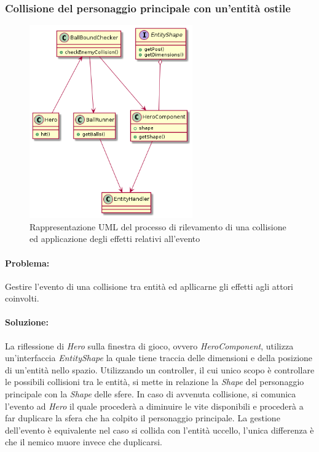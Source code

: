 \documentclass[a4paper,12pt]{report}
\begin{document}
\newpage
\subsubsection{Collisione del personaggio principale con un'entità ostile}
\begin{figure}[H]
    \centering{}
    \includegraphics[width=7cm]{img/Collision.png}
    \caption{Rappresentazione UML del processo di rilevamento di una collisione ed  applicazione degli effetti relativi all'evento}
    \end{figure}
    
\paragraph{Problema:} Gestire l'evento di una collisione tra entità ed apllicarne gli effetti agli attori coinvolti.

\paragraph{Soluzione:} La riflessione di \emph{Hero} sulla finestra di gioco, ovvero \emph{HeroComponent}, utilizza un'interfaccia \emph{EntityShape} la quale tiene traccia delle dimensioni e della posizione di un'entità nello spazio.
Utilizzando un controller, il cui unico scopo è controllare le possibili collisioni tra le entità, si mette in relazione la \emph{Shape} del personaggio principale con la \emph{Shape} delle sfere. In caso di avvenuta collisione, si comunica l'evento ad \emph{Hero} il quale procederà a diminuire le vite disponibili e procederà a far duplicare la sfera che ha colpito il personaggio principale. La gestione dell'evento è equivalente nel caso si collida con l'entità uccello, l'unica differenza è che il nemico muore invece che duplicarsi.
\end{document}
